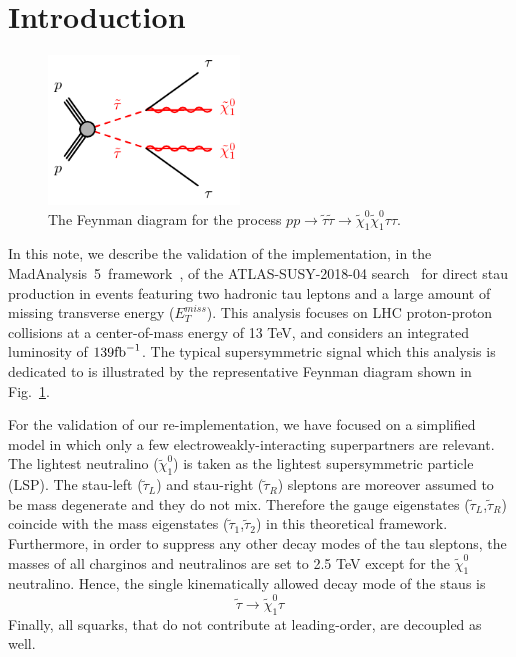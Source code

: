 \documentclass{ws-mpla}
\newcommand{\madanalysis}{{\sc MadAnalysis~5}}
\begin{document}

\section{Introduction}

\begin{figure}[t]
  \centerline{\includegraphics[width=2.0in]{fig_01}}
  \vspace*{8pt}
  \caption{The Feynman diagram for the process $pp\rightarrow\tilde{\tau}\tilde{\tau}\rightarrow\tilde{\chi}^0_1\tilde{\chi}^0_1\tau\tau$.\protect\label{fig:fig_01}}
\end{figure}

In this note, we describe the validation of the implementation, in the \madanalysis\ framework~\cite{Conte:2018vmg,Dumont:2014tja,Conte:2014zja,Conte:2012fm}, of the ATLAS-SUSY-2018-04 search~\cite{Aad:2019byo} for direct stau production in events featuring two hadronic tau leptons and a large amount of missing transverse energy ($E^{miss}_T$).
This analysis focuses on LHC proton-proton collisions at a center-of-mass energy of 13 TeV, and considers an integrated luminosity of $139 {\rm fb}^{-1}$.
The typical supersymmetric signal which this analysis is dedicated to is illustrated by the representative Feynman diagram shown in Fig.~\ref{fig:fig_01}. 

For the validation of our re-implementation, we have focused on a simplified model in which only a few electroweakly-interacting superpartners are relevant.
The lightest neutralino ($\tilde{\chi}^0_1$) is taken as the lightest supersymmetric particle (LSP).
The stau-left ($\tilde{\tau}_L$) and stau-right ($\tilde{\tau}_R$) sleptons are moreover assumed to be mass degenerate and they do not mix. Therefore the gauge eigenstates ($\tilde{\tau}_L$,$\tilde{\tau}_R$) coincide with the mass eigenstates ($\tilde{\tau}_1$,$\tilde{\tau}_2$) in this theoretical framework.
Furthermore, in order to suppress any other decay modes of the tau sleptons, the masses of all charginos and neutralinos are set to 2.5 TeV except for the $\tilde{\chi}^0_1$ neutralino. 
Hence, the single kinematically allowed decay mode of the staus is 
\begin{equation}
\tilde{\tau}\rightarrow\tilde{\chi}^0_1 \tau 
\end{equation}
Finally, all squarks, that do not contribute at leading-order, are decoupled as well.
\end{document}
